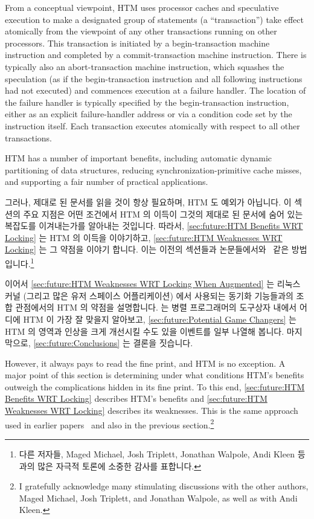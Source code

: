 From a conceptual viewpoint, HTM uses processor caches and speculative
execution to make a designated group of statements (a ``transaction'')
take effect atomically
from the viewpoint of any other transactions running on other processors.
This transaction is initiated by a
begin-transaction machine instruction and completed by a commit-transaction
machine instruction.
There is typically also an abort-transaction machine instruction, which
squashes the speculation (as if the begin-transaction instruction and
all following instructions had not executed) and commences execution
at a failure handler.
The location of the failure handler is typically specified by the
begin-transaction instruction, either as an explicit failure-handler
address or via a condition code set by the instruction itself.
Each transaction executes atomically with respect to all other transactions.

HTM has a number of important benefits, including automatic
dynamic partitioning of data structures, reducing synchronization-primitive
cache misses, and supporting a fair number of practical applications.

\fi

그러나, 제대로 된 문서를 읽을 것이 항상 필요하며, HTM 도 예외가 아닙니다.
이 섹션의 주요 지점은 어떤 조건에서 HTM 의 이득이 그것의 제대로 된 문서에 숨어
있는 복잡도를 이겨내는가를 알아내는 것입니다.
따라서, \cref{sec:future:HTM Benefits WRT Locking} 는 HTM 의 이득을 이야기하고,
\cref{sec:future:HTM Weaknesses WRT Locking} 는 그 약점을 이야기 합니다.
이는 이전의 섹션들과
논문들에서와~\cite{McKenney2007PLOSTM,PaulEMcKenney2010OSRGrassGreener} 같은
방법입니다.\footnote{
	다른 저자들, Maged Michael, Josh Triplett, Jonathan Walpole, Andi Kleen
	등과의 많은 자극적 토론에 소중한 감사를 표합니다.}

이어서
\cref{sec:future:HTM Weaknesses WRT Locking When Augmented} 는 리눅스 커널
(그리고 많은 유저 스페이스 어플리케이션) 에서 사용되는 동기화 기능들과의 조합
관점에서의 HTM 의 약점을 설명합니다.
 는 병렬 프로그래머의 도구상자
내에서 어디에 HTM 이 가장 잘 맞을지 알아보고,
\cref{sec:future:Potential Game Changers} 는 HTM 의 영역과 인상을 크게 개선시킬
수도 있을 이벤트를 일부 나열해 봅니다.
마지막으로, \cref{sec:future:Conclusions} 는 결론을 짓습니다.

\iffalse

However, it always pays to read the fine print, and HTM is no exception.
A major point of this section is determining under what conditions HTM's
benefits outweigh the complications hidden in its fine print.
To this end, \cref{sec:future:HTM Benefits WRT Locking}
describes HTM's benefits and
\cref{sec:future:HTM Weaknesses WRT Locking} describes its weaknesses.
This is the same approach used in earlier
papers~\cite{McKenney2007PLOSTM,PaulEMcKenney2010OSRGrassGreener}
and also in the previous section.\footnote{
	I gratefully acknowledge many stimulating
	discussions with the other authors, Maged Michael, Josh Triplett,
	and Jonathan Walpole, as well as with Andi Kleen.}

